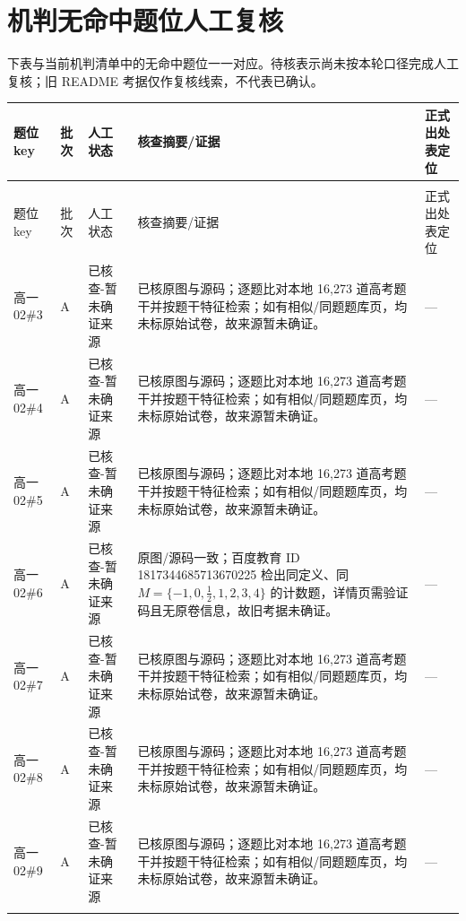 \documentclass[a4paper,11pt]{article}
\begin{document}
\clearpage
\section{机判无命中题位人工复核}

下表与当前机判清单中的无命中题位一一对应。待核表示尚未按本轮口径完成人工复核；旧 README 考据仅作复核线索，不代表已确认。

\begingroup\small
\newcommand{\tabhdrK}{\rowcolor{white} 题位 key & 批次 & 人工状态 & 核查摘要/证据 & 正式出处表定位 \\}
\begin{xltabular}{\textwidth}{@{}>{\raggedright\arraybackslash}p{2.60cm}>{\raggedright\arraybackslash}p{1.16cm}>{\raggedright\arraybackslash}p{2.32cm}>{\raggedright\arraybackslash}p{3.76cm}>{\raggedright\arraybackslash}p{4.05cm}@{}}
\toprule
\tabhdrK
\midrule
\endfirsthead
{} \\
\midrule
\tabhdrK
\midrule
\endhead
\bottomrule
\endlastfoot
高一02\#3 & A & 已核查-暂未确证来源 & 已核原图与源码；逐题比对本地 16,273 道高考题干并按题干特征检索；如有相似/同题题库页，均未标原始试卷，故来源暂未确证。 & --- \\ \addlinespace[1pt]
高一02\#4 & A & 已核查-暂未确证来源 & 已核原图与源码；逐题比对本地 16,273 道高考题干并按题干特征检索；如有相似/同题题库页，均未标原始试卷，故来源暂未确证。 & --- \\ \addlinespace[1pt]
高一02\#5 & A & 已核查-暂未确证来源 & 已核原图与源码；逐题比对本地 16,273 道高考题干并按题干特征检索；如有相似/同题题库页，均未标原始试卷，故来源暂未确证。 & --- \\ \addlinespace[1pt]
高一02\#6 & A & 已核查-暂未确证来源 & 原图/源码一致；百度教育 ID 1817344685713670225 检出同定义、同 \(M=\allowbreak \{-1,\allowbreak 0,\allowbreak \frac12,\allowbreak 1,\allowbreak 2,\allowbreak 3,\allowbreak 4\}\) 的计数题，详情页需验证码且无原卷信息，故旧考据未确证。 & --- \\ \addlinespace[1pt]
高一02\#7 & A & 已核查-暂未确证来源 & 已核原图与源码；逐题比对本地 16,273 道高考题干并按题干特征检索；如有相似/同题题库页，均未标原始试卷，故来源暂未确证。 & --- \\ \addlinespace[1pt]
高一02\#8 & A & 已核查-暂未确证来源 & 已核原图与源码；逐题比对本地 16,273 道高考题干并按题干特征检索；如有相似/同题题库页，均未标原始试卷，故来源暂未确证。 & --- \\ \addlinespace[1pt]
高一02\#9 & A & 已核查-暂未确证来源 & 已核原图与源码；逐题比对本地 16,273 道高考题干并按题干特征检索；如有相似/同题题库页，均未标原始试卷，故来源暂未确证。 & --- \\ \addlinespace[1pt]

\end{xltabular}
\end{document}

